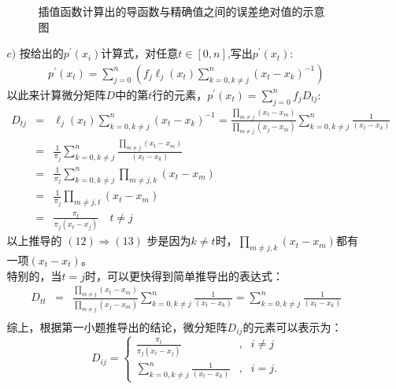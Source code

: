 \documentclass[12pt,a4paper,utf8]{ctexart}
\begin{document}
\begin{enumerate}
\begin{enumerate}
\begin{figure}[h]
              \caption{插值函数计算出的导函数与精确值之间的误差绝对值的示意图}
        \end{figure}

    \item[$c)$] 按给出的$p^{'}(x_i)$计算式，对任意$t\in[0,n]$,写出$p^{'}(x_t)$:
        \begin{eqnarray} 
            p^{'}(x_t)=\sum_{j=0}^{n}\left(f_{j}\ell_{j}(x_t)\sum_{k=0,k\neq j}^{n}(x_t-x_k)^{-1}\right)
        \end{eqnarray}
        以此来计算微分矩阵$D$中的第$t$行的元素，$p^{'}(x_t)=\sum_{j=0}^{n}f_{j}D_{tj}$:
        \begin{eqnarray} 
            D_{tj} &=& \ell_{j}(x_t)\sum_{k=0,k\neq j}^{n}(x_t-x_k)^{-1} = \frac{\prod_{m \neq j}(x_t-x_{m})}{\prod_{m \neq j}(x_{j}-x_{m})}\sum_{k=0,k\neq j}^{n}\frac{1}{(x_t-x_k)}\\
                   &=& \frac{1}{\pi_j}\sum_{k=0,k\neq j}^{n}\frac{\prod_{m \neq j}(x_t-x_{m})}{(x_t-x_k)}\\
                   &=& \frac{1}{\pi_j}\sum_{k=0,k\neq j}^{n}\prod_{m \neq j,k}(x_t-x_{m})\\
                   &=& \frac{1}{\pi_j}\prod_{m \neq j,t}(x_t-x_{m})\\
                   &=& \frac{\pi_t}{\pi_j(x_t-x_j)} \quad t\neq j
        \end{eqnarray}
        以上推导的 $(12)\Rightarrow (13)$ 步是因为$k\neq t$时，$\prod_{m \neq j,k}(x_t-x_{m})$都有一项$(x_t-x_t)$。\\
        特别的，当$t=j$时，可以更快得到简单推导出的表达式：
        \begin{eqnarray} 
            D_{tt}&=& \frac{\prod_{m \neq j}(x_t-x_{m})}{\prod_{m \neq j}(x_{j}-x_{m})}\sum_{k=0,k\neq j}^{n}\frac{1}{(x_t-x_k)} = \sum_{k=0,k\neq j}^{n}\frac{1}{(x_t-x_k)}\\
        \end{eqnarray}
        综上，根据第一小题推导出的结论，微分矩阵$D_{ij}$的元素可以表示为：
        \begin{equation}
            \label{eq6}
            D_{ij}=\left\{
            \begin{aligned}
                \frac{\pi_t}{\pi_j(x_t-x_j)}              & , & i\neq j \\
                \sum_{k=0,k\neq j}^{n}\frac{1}{(x_t-x_k)} & , & i=j.
            \end{aligned}
            \right.
        \end{equation}
        

\end{enumerate}
\end{enumerate}
\end{document}
